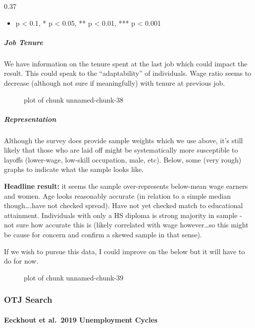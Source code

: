 0.37

\begin{itemize}
\tightlist
\item
  p \textless{} 0.1, * p \textless{} 0.05, ** p \textless{} 0.01, *** p
  \textless{} 0.001
\end{itemize}

\subparagraph{Job Tenure}\label{job-tenure}

We have information on the tenure spent at the last job which could
impact the result. This could speak to the ``adaptability'' of
individuals. Wage ratio seems to decrease (although not sure if
meaningfully) with tenure at previous job.

\begin{figure}
\centering
{}
\caption{plot of chunk unnamed-chunk-38}
\end{figure}

\subparagraph{Representation}\label{representation}

Although the survey does provide sample weights which we use above, it's
still likely that those who are laid off might be systematically more
susceptible to layoffs (lower-wage, low-skill occupation, male, etc).
Below, some (very rough) graphs to indicate what the sample looks like.

\textbf{Headline result:} it seems the sample over-represents below-mean
wage earners and women. Age looks reasonably accurate (in relation to a
simple median though\ldots.have not checked spread). Have not yet
checked match to educational attainment. Individuals with only a HS
diploma is strong majority in sample - not sure how accurate this is
(likely correlated with wage however\ldots so this might be cause for
concern and confirm a skewed sample in that sense).

If we wish to pursue this data, I could improve on the below but it will
have to do for now.

\begin{figure}
\centering
{}
\caption{plot of chunk unnamed-chunk-39}
\end{figure}

\subsubsection{OTJ Search}\label{otj-search}

\paragraph{Eeckhout et al.~2019 Unemployment
Cycles}\label{eeckhout-et-al.-2019-unemployment-cycles}

